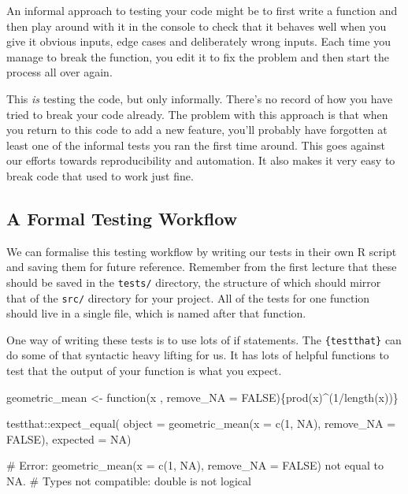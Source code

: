 \documentclass[
  letterpaper,
  DIV=11,
  numbers=noendperiod]{scrreprt}
\newenvironment{Shaded}{\begin{snugshade}}{\end{snugshade}}
\newcommand{\AttributeTok}[1]{\textcolor[rgb]{0.40,0.45,0.13}{#1}}
\newcommand{\CommentTok}[1]{\textcolor[rgb]{0.37,0.37,0.37}{#1}}
\newcommand{\ConstantTok}[1]{\textcolor[rgb]{0.56,0.35,0.01}{#1}}
\newcommand{\ControlFlowTok}[1]{\textcolor[rgb]{0.00,0.23,0.31}{#1}}
\newcommand{\DecValTok}[1]{\textcolor[rgb]{0.68,0.00,0.00}{#1}}
\newcommand{\FunctionTok}[1]{\textcolor[rgb]{0.28,0.35,0.67}{#1}}
\newcommand{\NormalTok}[1]{\textcolor[rgb]{0.00,0.23,0.31}{#1}}
\newcommand{\OtherTok}[1]{\textcolor[rgb]{0.00,0.23,0.31}{#1}}
\newcommand{\SpecialCharTok}[1]{\textcolor[rgb]{0.37,0.37,0.37}{#1}}
\begin{document}
An informal approach to testing your code might be to first write a
function and then play around with it in the console to check that it
behaves well when you give it obvious inputs, edge cases and
deliberately wrong inputs. Each time you manage to break the function,
you edit it to fix the problem and then start the process all over
again.

This \emph{is} testing the code, but only informally. There's no record
of how you have tried to break your code already. The problem with this
approach is that when you return to this code to add a new feature,
you'll probably have forgotten at least one of the informal tests you
ran the first time around. This goes against our efforts towards
reproducibility and automation. It also makes it very easy to break code
that used to work just fine.

\subsection{A Formal Testing Workflow}\label{a-formal-testing-workflow}

We can formalise this testing workflow by writing our tests in their own
R script and saving them for future reference. Remember from the first
lecture that these should be saved in the \texttt{tests/} directory, the
structure of which should mirror that of the \texttt{src/} directory for
your project. All of the tests for one function should live in a single
file, which is named after that function.

One way of writing these tests is to use lots of if statements. The
\texttt{\{testthat\}} can do some of that syntactic heavy lifting for
us. It has lots of helpful functions to test that the output of your
function is what you expect.

\begin{Shaded}
\begin{Highlighting}[]
\NormalTok{geometric\_mean }\OtherTok{\textless{}{-}} \ControlFlowTok{function}\NormalTok{(x , }\AttributeTok{remove\_NA =} \ConstantTok{FALSE}\NormalTok{)\{}\FunctionTok{prod}\NormalTok{(x)}\SpecialCharTok{\^{}}\NormalTok{(}\DecValTok{1}\SpecialCharTok{/}\FunctionTok{length}\NormalTok{(x))\}}
\end{Highlighting}
\end{Shaded}

\begin{Shaded}
\begin{Highlighting}[]
\NormalTok{testthat}\SpecialCharTok{::}\FunctionTok{expect\_equal}\NormalTok{(}
  \AttributeTok{object =} \FunctionTok{geometric\_mean}\NormalTok{(}\AttributeTok{x =} \FunctionTok{c}\NormalTok{(}\DecValTok{1}\NormalTok{, }\ConstantTok{NA}\NormalTok{), }\AttributeTok{remove\_NA =} \ConstantTok{FALSE}\NormalTok{),}
  \AttributeTok{expected =} \ConstantTok{NA}\NormalTok{)}

\CommentTok{\# Error: geometric\_mean(x = c(1, NA), remove\_NA = FALSE) not equal to NA.}
\CommentTok{\# Types not compatible: double is not logical}
\end{Highlighting}
\end{Shaded}
\end{document}
